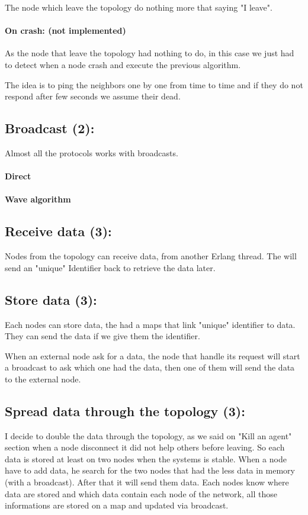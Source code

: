\documentclass[10pt,a4paper]{article}
\begin{document}
				\medbreak
				The node which leave the topology do nothing more that saying "I leave".
			
			\paragraph{On crash: (not implemented)}
				As the node that leave the topology had nothing to do, in this case we just had to detect when a node crash and execute the previous algorithm.
				
				\medbreak
				The idea is to ping the neighbors one by one from time to time and if they do not respond after few seconds we assume their dead.
				
		\subsection{Broadcast (2):}
			Almost all the protocols works with broadcasts.
				\paragraph{Direct}
				
				\paragraph{Wave algorithm}
		
		\subsection{Receive data (3):}
			Nodes from the topology can receive data, from another Erlang thread. The will send an "unique" Identifier back to retrieve the data later.
			
		\subsection{Store data (3):}
			Each nodes can store data, the had a maps that link "unique" identifier to data. They can send the data if we give them the identifier.
			
			\medbreak
			When an external node ask for a data, the node that handle its request will start a broadcast to ask which one had the data, then one of them will send the data to the external node.
		
		
		\subsection{Spread data through the topology (3):}
			I decide to double the data through the topology, as we said on  "Kill an agent" section when a node disconnect it did not help others before leaving.
			\medbreak
			So each data is stored at least on two nodes when the systems is stable. When a node have to add data, he search for the two nodes that had the less data in memory (with a broadcast). After that it will send them data.
			\medbreak
			Each nodes know where data are stored and which data contain each node of the network, all those informations are stored on a map and updated via broadcast.
			
\end{document}
